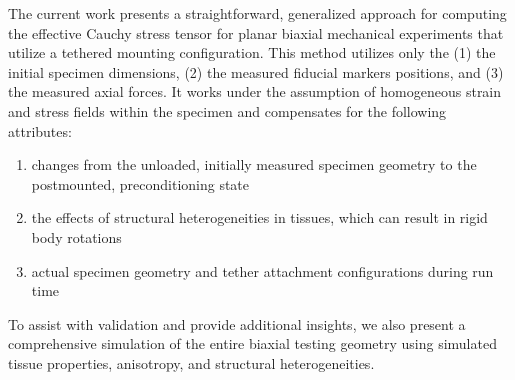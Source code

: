     
    The current work presents a straightforward, generalized approach for computing the effective Cauchy stress tensor for planar biaxial mechanical experiments that utilize a tethered mounting configuration. This method utilizes only the (1) the initial specimen dimensions, (2) the measured fiducial markers positions, and (3) the measured axial forces. It works under the assumption of homogeneous strain and stress fields within the specimen and compensates for the following attributes:
        \begin{enumerate}
            \item changes from the unloaded, initially measured specimen geometry to the postmounted, preconditioning state
            \item the effects of structural heterogeneities in tissues, which can result in rigid body rotations
            \item actual specimen geometry and tether attachment configurations during run time
        \end{enumerate}
    To assist with validation and provide additional insights, we also present a comprehensive simulation of the entire biaxial testing geometry using simulated tissue properties, anisotropy, and structural heterogeneities.